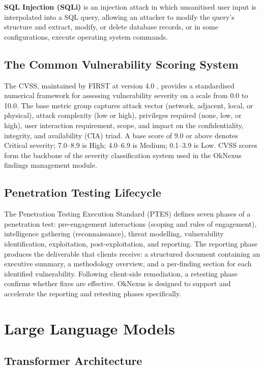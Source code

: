 \textbf{SQL Injection (SQLi)} is an injection attack in which unsanitised user input is interpolated into a SQL query, allowing an attacker to modify the query's structure and extract, modify, or delete database records, or in some configurations, execute operating system commands.

\subsection{The Common Vulnerability Scoring System}

The \acrshort{CVSS}, maintained by FIRST at version 4.0 \cite{cvss_nist}, provides a standardised numerical framework for assessing vulnerability severity on a scale from 0.0 to 10.0. The base metric group captures attack vector (network, adjacent, local, or physical), attack complexity (low or high), privileges required (none, low, or high), user interaction requirement, scope, and impact on the confidentiality, integrity, and availability (CIA) triad. A base score of 9.0 or above denotes Critical severity; 7.0--8.9 is High; 4.0--6.9 is Medium; 0.1--3.9 is Low. CVSS scores form the backbone of the severity classification system used in the OkNexus findings management module.

\subsection{Penetration Testing Lifecycle}

The Penetration Testing Execution Standard (PTES) \cite{ptes} defines seven phases of a penetration test: pre-engagement interactions (scoping and rules of engagement), intelligence gathering (reconnaissance), threat modelling, vulnerability identification, exploitation, post-exploitation, and reporting. The reporting phase produces the deliverable that clients receive: a structured document containing an executive summary, a methodology overview, and a per-finding section for each identified vulnerability. Following client-side remediation, a retesting phase confirms whether fixes are effective. OkNexus is designed to support and accelerate the reporting and retesting phases specifically.

\section{Large Language Models}

\subsection{Transformer Architecture}

